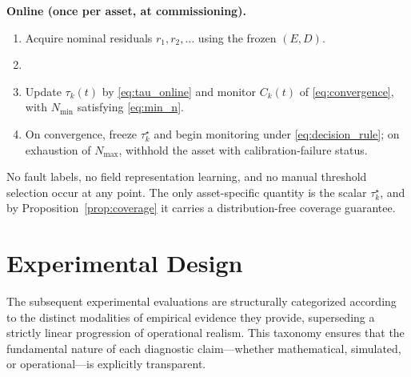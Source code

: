 \documentclass[a4paper]{cas-sc}
\newcommand{\residual}{\ensuremath{r}}
\begin{document}
\noindent\textbf{Online (once per asset, at commissioning).}
\begin{enumerate}[leftmargin=1.8em]
\item Acquire nominal residuals \(\residual_1,\residual_2,\ldots\) using
      the frozen \((E,D)\).
\item {}
\item Update \(\tau_k(t)\) by \eqref{eq:tau_online} and monitor
      \(C_k(t)\) of \eqref{eq:convergence}, with
      \(N_{\min}\) satisfying \eqref{eq:min_n}.
\item On convergence, freeze \(\tau_k^\star\) and begin monitoring under
      \eqref{eq:decision_rule}; on exhaustion of \(N_{\max}\), withhold the
      asset with calibration-failure status.
\end{enumerate}

No fault labels, no field representation learning, and no manual threshold
selection occur at any point. The only asset-specific quantity is the
scalar \(\tau_k^\star\), and by Proposition~\ref{prop:coverage} it carries
a distribution-free coverage guarantee.

\section{Experimental Design}
\label{sec:experimental_design}

The subsequent experimental evaluations are structurally categorized according to the distinct modalities of empirical evidence they provide, superseding a strictly linear progression of operational realism. This taxonomy ensures that the fundamental nature of each diagnostic claim—whether mathematical, simulated, or operational—is explicitly transparent.
\end{document}
